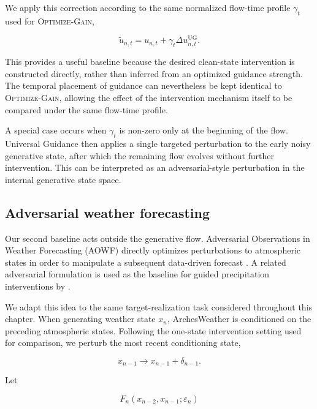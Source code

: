 We apply this correction according to the same normalized flow-time profile
\(\gamma_t\) used for \textsc{Optimize-Gain},

\begin{equation}
    \tilde{u}_{n,t}
    =
    u_{n,t}
    +
    \gamma_t
    \Delta u_{n,t}^{\mathrm{UG}}.
    \label{eq:ug-guided-velocity}
\end{equation}

This provides a useful baseline because the desired clean-state intervention is
constructed directly, rather than inferred from an optimized guidance
strength. The temporal placement of guidance can nevertheless be kept
identical to \textsc{Optimize-Gain}, allowing the effect of the intervention
mechanism itself to be compared under the same flow-time profile.

A special case occurs when \(\gamma_t\) is non-zero only at the beginning of
the flow. Universal Guidance then applies a single targeted perturbation to the
early noisy generative state, after which the remaining flow evolves without
further intervention. This can be interpreted as an adversarial-style
perturbation in the internal generative state space.

\subsection{Adversarial weather forecasting}
\label{sec:aowf-baseline}

Our second baseline acts outside the generative flow. Adversarial Observations
in Weather Forecasting (AOWF) directly optimizes perturbations to atmospheric
states in order to manipulate a subsequent data-driven forecast
\parencite{imgrund2025adversarial}. A related adversarial formulation is used
as the baseline for guided precipitation interventions by
\textcite{ueyama2026guided}.

We adapt this idea to the same target-realization task considered throughout
this chapter. When generating weather state \(x_n\), ArchesWeather is
conditioned on the preceding atmospheric states. Following the one-state
intervention setting used for comparison, we perturb the most recent
conditioning state,

\begin{equation}
    x_{n-1}
    \longrightarrow
    x_{n-1}+\delta_{n-1}.
\end{equation}

Let

\begin{equation}
    F_n
    \left(
        x_{n-2},
        x_{n-1};
        \varepsilon_n
    \right)
\end{equation}

